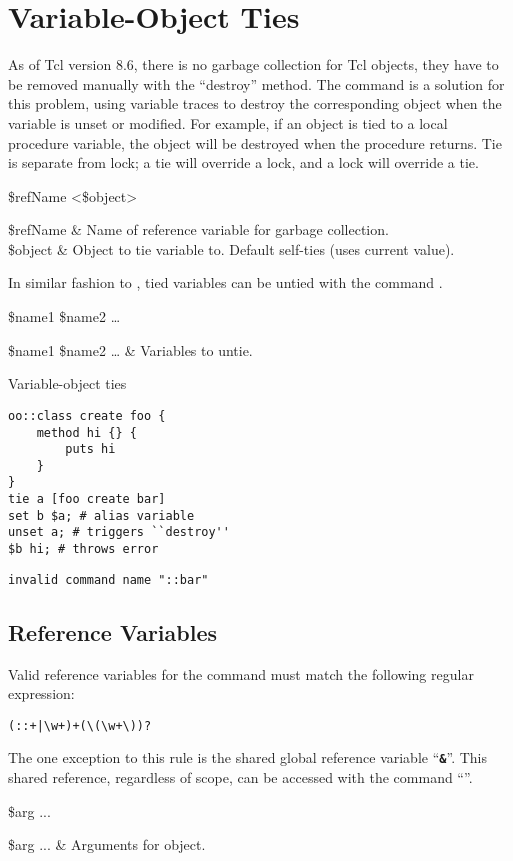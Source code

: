 \documentclass{article}
\begin{document}
\section{Variable-Object Ties}
As of Tcl version 8.6, there is no garbage collection for Tcl objects, they have to be removed manually with the ``destroy'' method. 
The command  is a solution for this problem, using variable traces to destroy the corresponding object when the variable is unset or modified. 
For example, if an object is tied to a local procedure variable, the object will be destroyed when the procedure returns.
Tie is separate from lock; a tie will override a lock, and a lock will override a tie. 

\begin{syntax}
 \$refName <\$object>
\end{syntax}
\begin{args}
\$refName & Name of reference variable for garbage collection. \\
\$object & Object to tie variable to. Default self-ties (uses current value).
\end{args}

In similar fashion to , tied variables can be untied with the command .
\begin{syntax}
 \$name1 \$name2 …
\end{syntax}
\begin{args}
\$name1 \$name2 … & Variables to untie.
\end{args}

\begin{example}{Variable-object ties}
\begin{lstlisting}
oo::class create foo {
    method hi {} {
        puts hi
    }
}
tie a [foo create bar]
set b $a; # alias variable
unset a; # triggers ``destroy''
$b hi; # throws error
\end{lstlisting}
\tcblower
\begin{lstlisting}
invalid command name "::bar"
\end{lstlisting}
\end{example}
\clearpage
\subsection{Reference Variables}
Valid reference variables for the  command must match the following regular expression:
\begin{lstlisting}
(::+|\w+)+(\(\w+\))?
\end{lstlisting}
The one exception to this rule is the shared global reference variable ``\textbf{\texttt{\&}}''. 
This shared reference, regardless of scope, can be accessed with the command ``\textbf{\texttt{\cmdlink{\$\&}}}''.
\begin{syntax}
\command{\$\&} \$arg ...
\end{syntax}
\begin{args}
\$arg ... & Arguments for object.
\end{args}
\end{document}
